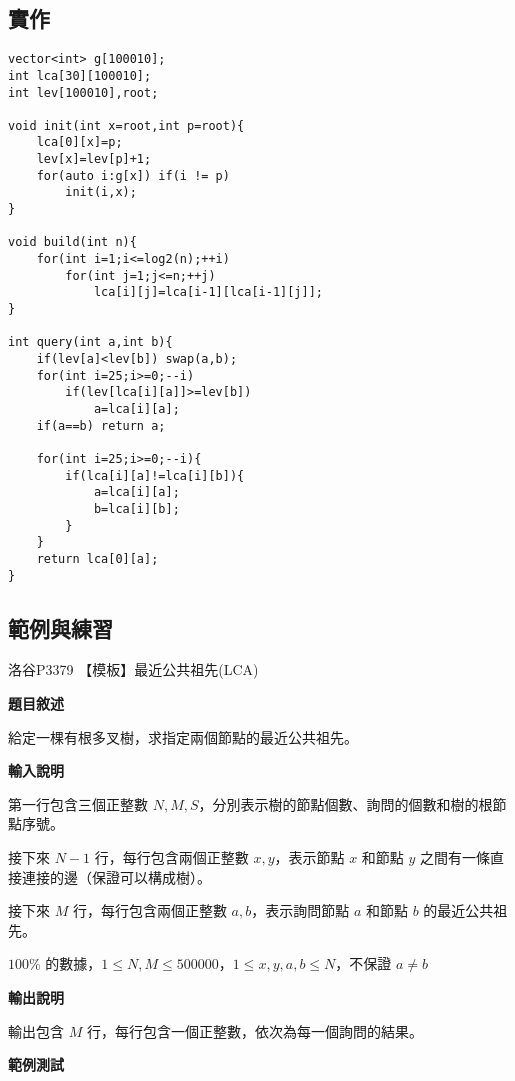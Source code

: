     \subsection{實作}

\begin{lstlisting}[caption=$O(\log{(n)})$查詢LCA算法]
vector<int> g[100010];
int lca[30][100010];
int lev[100010],root;

void init(int x=root,int p=root){
    lca[0][x]=p;
    lev[x]=lev[p]+1;
    for(auto i:g[x]) if(i != p) 
        init(i,x);
}

void build(int n){
    for(int i=1;i<=log2(n);++i)
        for(int j=1;j<=n;++j)
            lca[i][j]=lca[i-1][lca[i-1][j]];
}

int query(int a,int b){
    if(lev[a]<lev[b]) swap(a,b);
    for(int i=25;i>=0;--i)
        if(lev[lca[i][a]]>=lev[b])
            a=lca[i][a];
    if(a==b) return a;

    for(int i=25;i>=0;--i){
        if(lca[i][a]!=lca[i][b]){
            a=lca[i][a];
            b=lca[i][b];
        }
    }
    return lca[0][a];
}
\end{lstlisting}

    \subsection{範例與練習}

    \problem 洛谷P3379 【模板】最近公共祖先(LCA)

    \textbf{題目敘述}

    給定一棵有根多叉樹，求指定兩個節點的最近公共祖先。

    \textbf{輸入說明}

    第一行包含三個正整數 $N,M,S$，分別表示樹的節點個數、詢問的個數和樹的根節點序號。

    接下來 $N-1$ 行，每行包含兩個正整數 $x, y$，表示節點 $x$ 和節點 $y$ 之間有一條直接連接的邊（保證可以構成樹）。

    接下來 $M$ 行，每行包含兩個正整數 $a, b$，表示詢問節點 $a$ 和節點 $b$ 的最近公共祖先。

    $100\%$ 的數據，$1 \leq N,M \leq 500000$，$1 \leq x, y, a, b \leq N$，不保證 $a \neq b$
    
    \textbf{輸出說明}

    輸出包含 $M$ 行，每行包含一個正整數，依次為每一個詢問的結果。

    \textbf{範例測試}

